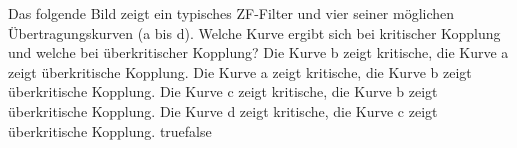     {Das folgende Bild zeigt ein typisches ZF-Filter und vier seiner möglichen Übertragungskurven (a bis d). Welche Kurve ergibt sich bei kritischer Kopplung und welche bei überkritischer Kopplung?}
    {Die Kurve b zeigt kritische, die Kurve a zeigt überkritische Kopplung.}
    {Die Kurve a zeigt kritische, die Kurve b zeigt überkritische Kopplung.}
    {Die Kurve c zeigt kritische, die Kurve b zeigt überkritische Kopplung.}
    {Die Kurve d zeigt kritische, die Kurve c zeigt überkritische Kopplung.}
    {true}{false}